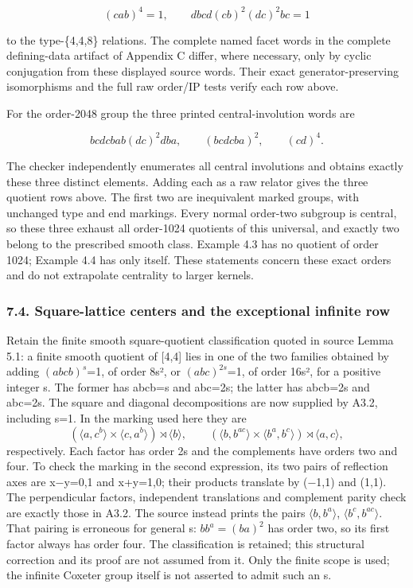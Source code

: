 \documentclass[
  11pt,
  a4paper,
]{article}
\begin{document}
\[
(cab)^4=1,\qquad dbcd(cb)^2(dc)^2bc=1
\tag{N3}
\]

to the type-\{4,4,8\} relations. The complete named facet words in the
complete defining-data artifact of Appendix C differ, where necessary,
only by cyclic conjugation from these displayed source words. Their
exact generator-preserving isomorphisms and the full raw order/IP tests
verify each row above.

For the order-2048 group the three printed central-involution words are

\[
bcdcbab(dc)^2dba,\qquad(bcdcba)^2,\qquad(cd)^4.
\tag{N4}
\]

The checker independently enumerates all central involutions and obtains
exactly these three distinct elements. Adding each as a raw relator
gives the three quotient rows above. The first two are inequivalent
marked groups, with unchanged type and end markings. Every normal
order-two subgroup is central, so these three exhaust all order-1024
quotients of this universal, and exactly two belong to the prescribed
smooth class. Example 4.3 has no quotient of order 1024; Example 4.4 has
only itself. These statements concern these exact orders and do not
extrapolate centrality to larger kernels.

\subsubsection{7.4. Square-lattice centers and the exceptional infinite
row}\label{square-lattice-centers-and-the-exceptional-infinite-row}

Retain the finite smooth square-quotient classification quoted in source
Lemma 5.1: a finite smooth quotient of {[}4,4{]} lies in one of the two
families obtained by adding \((abcb)^{s}\)=1, of order 8s², or
\((abc)^{2s}\)=1, of order 16s², for a positive integer s. The former
has \textbar abcb\textbar=s and \textbar abc\textbar=2s; the latter has
\textbar abcb\textbar=2s and \textbar abc\textbar=2s. The square and
diagonal decompositions are now supplied by A3.2, including s=1. In the
marking used here they are \[
 (\langle a,c^b\rangle\times\langle c,a^b\rangle)\rtimes\langle b\rangle,
 \qquad
 (\langle b,b^{ac}\rangle\times\langle b^a,b^c\rangle)\rtimes\langle a,c\rangle,
\] respectively. Each factor has order 2s and the complements have
orders two and four. To check the marking in the second expression, its
two pairs of reflection axes are x−y=0,1 and x+y=1,0; their products
translate by (−1,1) and (1,1). The perpendicular factors, independent
translations and complement parity check are exactly those in A3.2. The
source instead prints the pairs \(\langle b,b^a\rangle\),
\(\langle b^c,b^{ac}\rangle\). That pairing is erroneous for general s:
\(bb^a=(ba)^2\) has order two, so its first factor always has order
four. The classification is retained; this structural correction and its
proof are not assumed from it. Only the finite scope is used; the
infinite Coxeter group itself is not asserted to admit such an s.
\end{document}
